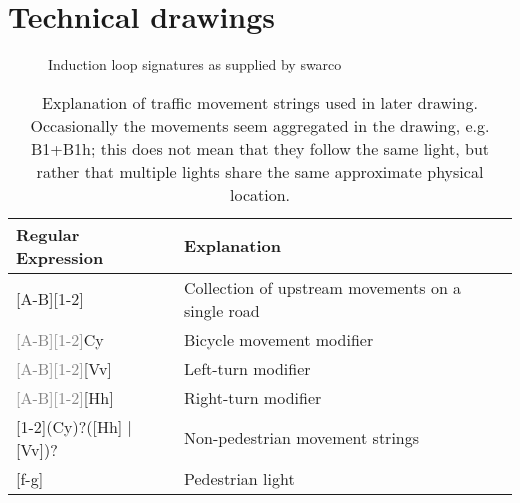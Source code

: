 \section{Technical drawings}
\label{appendix:techdraw}
\begin{figure}[!htb]
    \centering
    \caption{Induction loop signatures as supplied by swarco}
    \label{fig:inductionsignatures}
\end{figure}
\begin{table}[!htb]
    \centering
    \begin{tabular}{|l|l|}\hline
        Regular Expression & Explanation \\\hline
        {[A-B]}[1-2] & Collection of upstream movements on a single road\\\hline
        \textcolor{gray}{[A-B][1-2]}Cy & Bicycle movement modifier\\\hline
        \textcolor{gray}{[A-B][1-2]}[Vv] & Left-turn modifier\\\hline
        \textcolor{gray}{[A-B][1-2]}[Hh] & Right-turn modifier\\\hline
        [A-B][1-2](Cy)?([Hh] | [Vv])? & Non-pedestrian movement strings\\\hline
        [a-b][f-g] & Pedestrian light\\\hline
    \end{tabular}
    \caption{Explanation of traffic movement strings used in later drawing. Occasionally the movements seem aggregated in the drawing, e.g. B1+B1h; this does not mean that they follow the same light, but rather that multiple lights share the same approximate physical location.}
    \label{tab:intersectionmovements}
\end{table}

